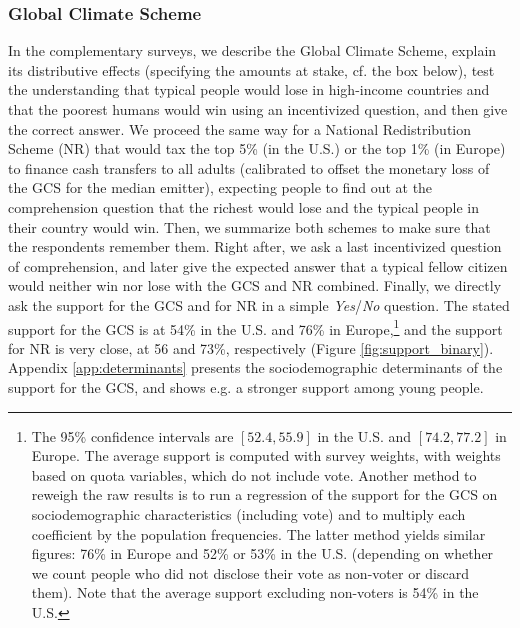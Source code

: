\subsubsection{Global Climate Scheme} %
In the complementary surveys, we describe the Global Climate Scheme, explain its distributive effects (specifying the amounts at stake, cf. the box below), %
test the understanding that typical people would lose in high-income countries and that the poorest humans would win using an incentivized question, and then give the correct answer. We proceed the same way for a National Redistribution Scheme (NR) that would tax the top 5\% (in the U.S.) or the top 1\% (in Europe) to finance cash transfers to all adults (calibrated to offset the monetary loss of the GCS for the median emitter), expecting people to find out at the comprehension question that the richest would lose and the typical people in their country would win. Then, we summarize both schemes to make sure that the respondents remember them. Right after, we ask a last incentivized question of comprehension, and later give the expected answer that a typical fellow citizen would neither win nor lose with the GCS and NR combined. Finally, we directly ask the support for the GCS and for NR in a simple \textit{Yes}/\textit{No} question. The stated support for the GCS is at 54\% in the U.S. and 76\% in Europe,\footnote{The 95\% confidence intervals are $[52.4, 55.9]$ in the U.S. and $[74.2, 77.2]$ in Europe. The average support is computed with survey weights, with weights based on quota variables, which do not include vote. Another method to reweigh the raw results is to run a regression of the support for the GCS on sociodemographic characteristics (including vote) and to multiply each coefficient by the population frequencies. The latter method yields similar figures: 76\% in Europe and 52\% or 53\% in the U.S. (depending on whether we count people who did not disclose their vote as non-voter or discard them). Note that the average support excluding non-voters is 54\% in the U.S.} and the support for NR is very close, at 56 and 73\%, respectively (Figure \ref{fig:support_binary}). %
Appendix \ref{app:determinants} presents the sociodemographic determinants of the support for the GCS, and shows e.g. a stronger support among young people. %

